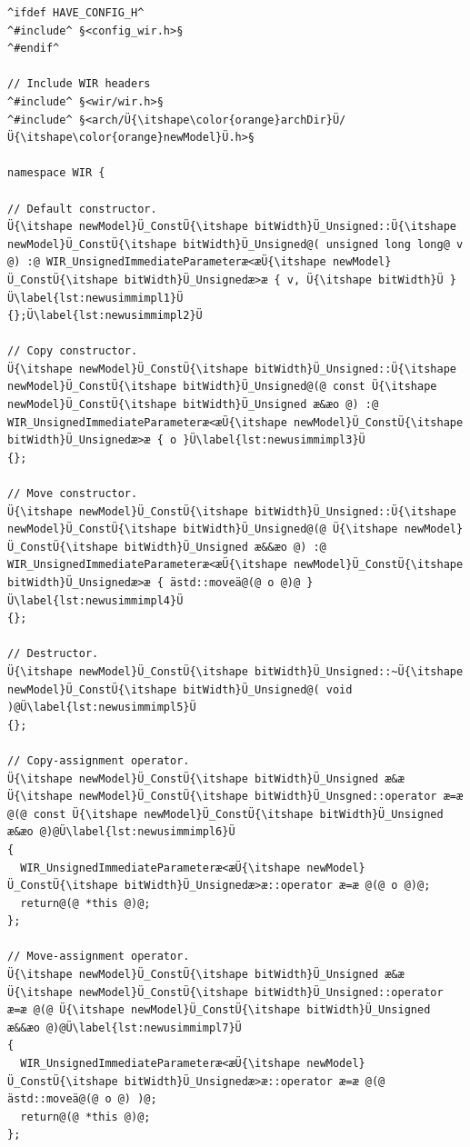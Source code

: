 \begin{enumerate}[resume]
\begin{lstlisting}[style=code,float=!t,caption={Implementation of a New Unsigned Immediate Parameter's Class},label=lst:newusimmimpl]
^ifdef HAVE_CONFIG_H^
^#include^ §<config_wir.h>§
^#endif^

// Include WIR headers
^#include^ §<wir/wir.h>§
^#include^ §<arch/Ü{\itshape\color{orange}archDir}Ü/Ü{\itshape\color{orange}newModel}Ü.h>§

namespace WIR {

// Default constructor.
Ü{\itshape newModel}Ü_ConstÜ{\itshape bitWidth}Ü_Unsigned::Ü{\itshape newModel}Ü_ConstÜ{\itshape bitWidth}Ü_Unsigned@( unsigned long long@ v @) :@ WIR_UnsignedImmediateParameteræ<æÜ{\itshape newModel}Ü_ConstÜ{\itshape bitWidth}Ü_Unsignedæ>æ { v, Ü{\itshape bitWidth}Ü }Ü\label{lst:newusimmimpl1}Ü
{};Ü\label{lst:newusimmimpl2}Ü

// Copy constructor.
Ü{\itshape newModel}Ü_ConstÜ{\itshape bitWidth}Ü_Unsigned::Ü{\itshape newModel}Ü_ConstÜ{\itshape bitWidth}Ü_Unsigned@(@ const Ü{\itshape newModel}Ü_ConstÜ{\itshape bitWidth}Ü_Unsigned æ&æo @) :@ WIR_UnsignedImmediateParameteræ<æÜ{\itshape newModel}Ü_ConstÜ{\itshape bitWidth}Ü_Unsignedæ>æ { o }Ü\label{lst:newusimmimpl3}Ü
{};

// Move constructor.
Ü{\itshape newModel}Ü_ConstÜ{\itshape bitWidth}Ü_Unsigned::Ü{\itshape newModel}Ü_ConstÜ{\itshape bitWidth}Ü_Unsigned@(@ Ü{\itshape newModel}Ü_ConstÜ{\itshape bitWidth}Ü_Unsigned æ&&æo @) :@ WIR_UnsignedImmediateParameteræ<æÜ{\itshape newModel}Ü_ConstÜ{\itshape bitWidth}Ü_Unsignedæ>æ { ästd::moveä@(@ o @)@ }Ü\label{lst:newusimmimpl4}Ü
{};

// Destructor.
Ü{\itshape newModel}Ü_ConstÜ{\itshape bitWidth}Ü_Unsigned::~Ü{\itshape newModel}Ü_ConstÜ{\itshape bitWidth}Ü_Unsigned@( void )@Ü\label{lst:newusimmimpl5}Ü
{};

// Copy-assignment operator.
Ü{\itshape newModel}Ü_ConstÜ{\itshape bitWidth}Ü_Unsigned æ&æ Ü{\itshape newModel}Ü_ConstÜ{\itshape bitWidth}Ü_Unsgned::operator æ=æ @(@ const Ü{\itshape newModel}Ü_ConstÜ{\itshape bitWidth}Ü_Unsigned æ&æo @)@Ü\label{lst:newusimmimpl6}Ü
{
  WIR_UnsignedImmediateParameteræ<æÜ{\itshape newModel}Ü_ConstÜ{\itshape bitWidth}Ü_Unsignedæ>æ::operator æ=æ @(@ o @)@;
  return@(@ *this @)@;
};

// Move-assignment operator.
Ü{\itshape newModel}Ü_ConstÜ{\itshape bitWidth}Ü_Unsigned æ&æ Ü{\itshape newModel}Ü_ConstÜ{\itshape bitWidth}Ü_Unsigned::operator æ=æ @(@ Ü{\itshape newModel}Ü_ConstÜ{\itshape bitWidth}Ü_Unsigned æ&&æo @)@Ü\label{lst:newusimmimpl7}Ü
{
  WIR_UnsignedImmediateParameteræ<æÜ{\itshape newModel}Ü_ConstÜ{\itshape bitWidth}Ü_Unsignedæ>æ::operator æ=æ @(@ ästd::moveä@(@ o @) )@;
  return@(@ *this @)@;
};


\end{lstlisting}
\end{enumerate}
